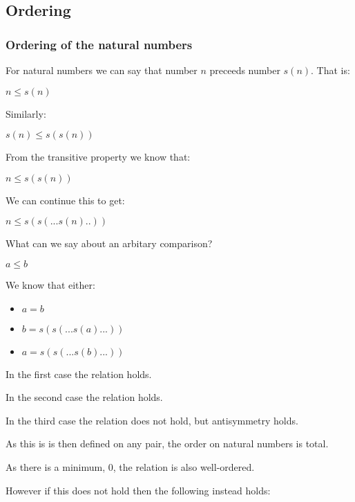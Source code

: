 
\subsection{Ordering}

\subsubsection{Ordering of the natural numbers}

For natural numbers we can say that number \(n\) preceeds number \(s(n)\). That is:

\(n\le s(n)\)

Similarly:

\(s(n)\le s(s(n))\)

From the transitive property we know that:

\(n\le s(s(n))\)

We can continue this to get:

\(n\le s(s(...s(n)..))\)

What can we say about an arbitary comparison?

\(a\le b\)

We know that either:

\begin{itemize}
\item \(a=b\)
\item \(b=s(s(...s(a)...))\)
\item \(a=s(s(...s(b)...))\)
\end{itemize}

In the first case the relation holds.

In the second case the relation holds.

In the third case the relation does not hold, but antisymmetry holds.

As this is is then defined on any pair, the order on natural numbers is total.

As there is a minimum, \(0\), the relation is also well-ordered.

However if this does not hold then the following instead holds:

